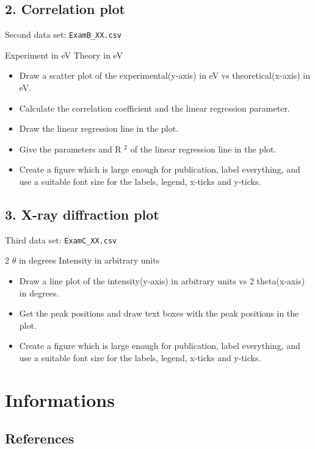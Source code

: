 \documentclass[
  letterpaper,
  DIV=11,
  numbers=noendperiod]{scrreprt}
\providecommand{\tightlist}{%
  \setlength{\itemsep}{0pt}\setlength{\parskip}{0pt}}\usepackage{longtable,booktabs,array}
\begin{document}
\chapter{2. Correlation plot}\label{correlation-plot}

Second data set: \texttt{ExamB\_XX.csv}

Experiment in eV \textbar{} Theory in eV

\begin{itemize}
\tightlist
\item
  Draw a scatter plot of the experimental(y-axis) in eV vs
  theoretical(x-axis) in eV.
\item
  Calculate the correlation coefficient and the linear regression
  parameter.
\item
  Draw the linear regression line in the plot.
\item
  Give the parameters and R \(^2\) of the linear regression line in the
  plot.
\item
  Create a figure which is large enough for publication, label
  everything, and use a suitable font size for the labels, legend,
  x-ticks and y-ticks.
\end{itemize}

\chapter{3. X-ray diffraction plot}\label{x-ray-diffraction-plot}

Third data set: \texttt{ExamC\_XX.csv}

2 \(\theta\) in degrees \textbar{} Intensity in arbitrary units

\begin{itemize}
\tightlist
\item
  Draw a line plot of the intensity(y-axis) in arbitrary units vs 2
  theta(x-axis) in degrees.
\item
  Get the peak positions and draw text boxes with the peak positions in
  the plot.
\item
  Create a figure which is large enough for publication, label
  everything, and use a suitable font size for the labels, legend,
  x-ticks and y-ticks.
\end{itemize}

\part{Informations}

\chapter*{References}\label{references}
\end{document}
